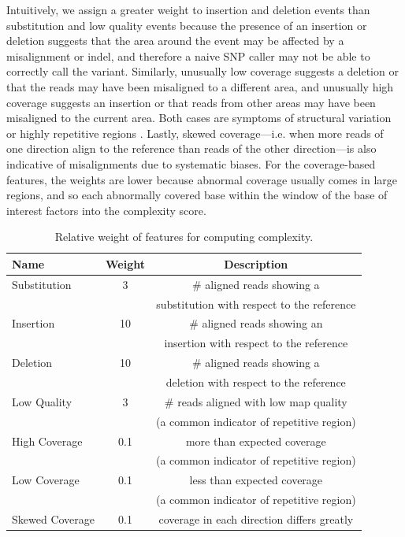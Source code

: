\documentclass[10pt]{article}
\begin{document}
Intuitively, we assign a greater weight to insertion and deletion events than substitution and low quality events because the presence of an insertion or deletion suggests that the area around the event may be affected by a misalignment or indel, and therefore a naive SNP caller may not be able to correctly call the variant.
Similarly, unusually low coverage suggests a deletion or that the reads may have been misaligned to a different area, and unusually high coverage suggests an insertion or that reads from other areas may have been misaligned to the current area.
Both cases are symptoms of structural variation or highly repetitive regions \cite{structuralVar}.
Lastly, skewed coverage---i.e. when more reads of one direction align to the reference than reads of the other direction---is also indicative of misalignments due to systematic biases.
For the coverage-based features, the weights are lower because abnormal coverage usually comes in large regions, and so each abnormally covered base within the window of the base of interest factors into the complexity score.
\begin{table}[h!]
\tiny
  \centering
	\begin{tabular}{|l|c|c|}
    \hline Name & Weight & Description \\\hline
    Substitution & 3 & $\#$ aligned reads showing a \\ && substitution with respect to the reference\\\hline
    Insertion & 10 & $\#$ aligned reads showing an \\ && insertion with respect to the reference\\\hline
    Deletion & 10 & $\#$ aligned reads showing a \\ && deletion with respect to the reference\\\hline
    Low Quality & 3 & $\#$ reads aligned with low map quality \\ && (a common indicator of repetitive region)\\\hline
    High Coverage & 0.1 & more than expected coverage \\ && (a common indicator of repetitive region)\\\hline
    Low Coverage & 0.1 & less than expected coverage \\ && (a common indicator of repetitive region)\\\hline
    Skewed Coverage & 0.1 & coverage in each direction differs greatly \\\hline
  \end{tabular}
  \caption{Relative weight of features for computing complexity.}
  \label{complexity}
\end{table}
\end{document}
